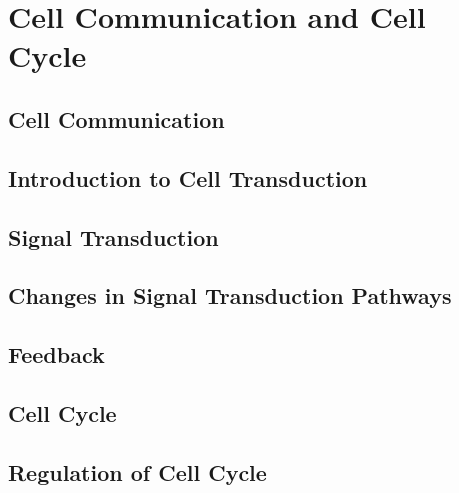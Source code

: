 \documentclass[../bio.tex]{subfiles}
\begin{document}
\chapter{Cell Communication and Cell Cycle}
\section{Cell Communication}
\section{Introduction to Cell Transduction}
\section{Signal Transduction}
\section{Changes in Signal Transduction Pathways}
\section{Feedback}
\section{Cell Cycle}
\section{Regulation of Cell Cycle}
\end{document}
